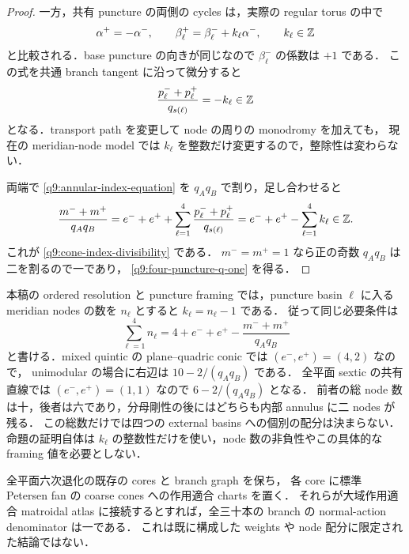 \begin{proof}
一方，共有 puncture の両側の cycles は，実際の regular torus の中で
\[
 \alpha^+=-\alpha^- ,\qquad
 \beta_\ell^+=\beta_\ell^-+k_\ell\alpha^-,
 \qquad k_\ell\in\mathbb Z
\]
と比較される．base puncture の向きが同じなので $\beta_\ell^-$ の係数は $+1$ である．
この式を共通 branch tangent に沿って微分すると
\begin{equation}\label{q9:puncture-integrality}
 \frac{p_\ell^-+p_\ell^+}{q_{s(\ell)}}=-k_\ell\in\mathbb Z
\end{equation}
となる．transport path を変更して node の周りの monodromy を加えても，
現在の meridian-node model では $k_\ell$ を整数だけ変更するので，整除性は変わらない．

両端で \eqref{q9:annular-index-equation} を $q_Aq_B$ で割り，足し合わせると
\[
 \frac{m^-+m^+}{q_Aq_B}
 =e^-+e^+
  +\sum_{\ell=1}^4\frac{p_\ell^-+p_\ell^+}{q_{s(\ell)}}
 =e^-+e^+-\sum_{\ell=1}^4 k_\ell\in\mathbb Z.
\]
これが \eqref{q9:cone-index-divisibility} である．
$m^-=m^+=1$ なら正の奇数 $q_Aq_B$ は二を割るので一であり，
\eqref{q9:four-puncture-q-one} を得る．
\end{proof}

\begin{remark}\label{q9:node-budget}
本稿の ordered resolution と puncture framing では，puncture basin $\ell$ に入る
meridian nodes の数を $n_\ell$ とすると $k_\ell=n_\ell-1$ である．
従って同じ必要条件は
\begin{equation}\label{q9:external-node-budget}
 \sum_{\ell=1}^4 n_\ell
 =4+e^-+e^+-\frac{m^-+m^+}{q_Aq_B}
\end{equation}
と書ける．mixed quintic の plane--quadric conic では $(e^-,e^+)=(4,2)$ なので，
unimodular の場合に右辺は $10-2/(q_Aq_B)$ である．
全平面 sextic の共有直線では $(e^-,e^+)=(1,1)$ なので $6-2/(q_Aq_B)$ となる．
前者の総 node 数は十，後者は六であり，分母剛性の後にはどちらも内部 annulus に二 nodes が残る．
この総数だけでは四つの external basins への個別の配分は決まらない．
命題の証明自体は $k_\ell$ の整数性だけを使い，node 数の非負性やこの具体的な framing 値を必要としない．
\end{remark}

\begin{corollary}\label{q9:sextic-rigidity}
全平面六次退化の既存の cores と branch graph を保ち，
各 core に標準 Petersen fan の coarse cones への作用適合 charts を置く．
それらが大域作用適合 matroidal atlas に接続するとすれば，全三十本の branch の
normal-action denominator は一である．
これは既に構成した weights や node 配分に限定された結論ではない．
\end{corollary}

